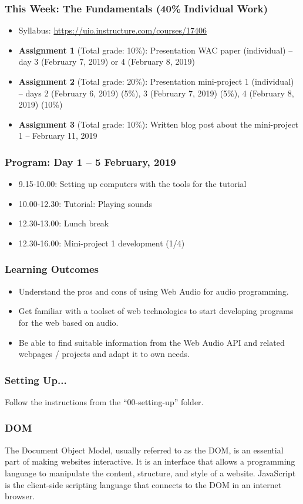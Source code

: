\documentclass[screen, aspectratio=43]{beamer}
\begin{document}
%
\begin{frame}
\frametitle{This Week: The Fundamentals (40\% Individual Work)}
\begin{itemize}
\item Syllabus: \url{https://uio.instructure.com/courses/17406}
\item \textbf{Assignment 1} (Total grade: 10\%): Presentation WAC paper (individual) -- day 3 (February 7, 2019) or 4 (February 8, 2019)
\item \textbf{Assignment 2} (Total grade: 20\%): Presentation mini-project 1 (individual) -- days 2 (February 6, 2019) (5\%), 3 (February 7, 2019) (5\%), 4 (February 8, 2019) (10\%)
\item \textbf{Assignment 3} (Total grade: 10\%): Written blog post about the mini-project 1 -- February 11, 2019
\end{itemize}
\end{frame}
%
\begin{frame}
\frametitle{Program: Day 1 -- 5 February, 2019}
\begin{itemize}
\item 9.15-10.00: Setting up computers with the tools for the tutorial
\item 10.00-12.30: Tutorial: Playing sounds
\item 12.30-13.00: Lunch break
\item 12.30-16.00: Mini-project 1 development (1/4)
\end{itemize}
\end{frame}
%
\begin{frame}
\frametitle{Learning Outcomes}
\begin{itemize}
\item Understand the pros and cons of using Web Audio for audio programming.
\item Get familiar with a toolset of web technologies to start developing programs for the web based on audio.
\item Be able to find suitable information from the Web Audio API and related webpages / projects and adapt it to own needs.
\end{itemize}
\end{frame}
%
\begin{frame}
\frametitle{Setting Up...}
Follow the instructions from the ``00-setting-up'' folder.
\end{frame}
%
\begin{frame}
\frametitle{DOM}
The Document Object Model, usually referred to as the DOM, is an essential part of making websites interactive. It is an interface that allows a programming language to manipulate the content, structure, and style of a website. JavaScript is the client-side scripting language that connects to the DOM in an internet browser.
\end{frame}
\end{document}

